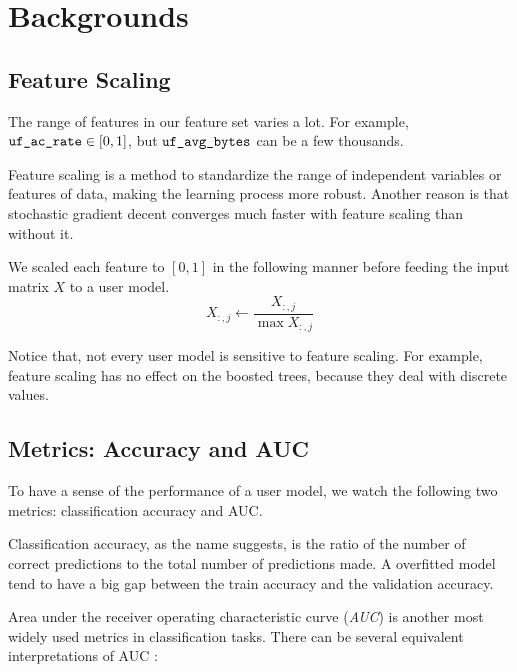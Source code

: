 \section{Backgrounds}

    \subsection{Feature Scaling}

        The range of features in our feature set varies a lot.
        For example, $\verb|uf_ac_rate| \in [0,1]$, but $\verb|uf_avg_bytes|$ can be a few thousands.

        Feature scaling is a method to standardize the range of independent variables or features of data,
        making the learning process more robust. 
        Another reason is that stochastic gradient decent converges much faster with feature scaling than without it.
        \cite{ioffe_batch_2015}

        We scaled each feature to $[0,1]$ in the following manner before feeding the input matrix $X$ to a user model.
        \[
        X_{:,j} \leftarrow \frac{X_{:,j}}{\max X_{:,j}}
        \]

        Notice that, not every user model is sensitive to feature scaling.
        For example, feature scaling has no effect on the boosted trees, because they deal with discrete values.

    \subsection{Metrics: Accuracy and AUC}

        To have a sense of the performance of a user model, we watch the following two metrics:
        classification accuracy and AUC.

        Classification accuracy, as the name suggests, is the ratio of
        the number of correct predictions to the total number of predictions made.
        A overfitted model tend to have a big gap between the train accuracy and the validation accuracy.

        Area under the receiver operating characteristic curve (\emph{AUC})
        is another most widely used metrics in classification tasks.
        There can be several equivalent interpretations of AUC \cite{flach_putting_2007}:

